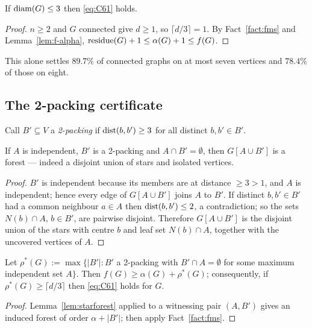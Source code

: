 \begin{theorem}\label{thm:diam3}
\Selem
If $\operatorname{diam}(G) \le 3$ then \eqref{eq:C61} holds.
\end{theorem}

\begin{proof}
$n \ge 2$ and $G$ connected give $d \ge 1$, so $\lceil d/3 \rceil = 1$. By
Fact~\ref{fact:fms} and Lemma~\ref{lem:f-alpha},
$\operatorname{residue}(G) + 1 \le \alpha(G) + 1 \le f(G)$.
\end{proof}

This alone settles $89.7\%$ of connected graphs on at most seven vertices and $78.4\%$ of
those on eight.

\subsection{The 2-packing certificate}

Call $B' \subseteq V$ a \emph{2-packing} if $\operatorname{dist}(b,b') \ge 3$ for all distinct
$b,b' \in B'$.

\begin{lemma}\label{lem:starforest}
\Selem
If $A$ is independent, $B'$ is a 2-packing and $A \cap B' = \emptyset$, then
$G[A \cup B']$ is a forest --- indeed a disjoint union of stars and isolated vertices.
\end{lemma}

\begin{proof}
$B'$ is independent because its members are at distance $\ge 3 > 1$, and $A$ is
independent; hence every edge of $G[A \cup B']$ joins $A$ to $B'$. If distinct
$b,b' \in B'$ had a common neighbour $a \in A$ then $\operatorname{dist}(b,b') \le 2$, a contradiction;
so the sets $N(b) \cap A$, $b \in B'$, are pairwise disjoint. Therefore $G[A \cup B']$ is
the disjoint union of the stars with centre $b$ and leaf set $N(b) \cap A$, together with
the uncovered vertices of $A$.
\end{proof}

\begin{theorem}\label{thm:packing}
\Selem
Let
$\rho^{*}(G) := \max\{ |B'| : B'$ a 2-packing with $B' \cap A = \emptyset$ for some maximum
independent set $A \}$.
Then $f(G) \ge \alpha(G) + \rho^{*}(G)$; consequently, if
$\rho^{*}(G) \ge \lceil d/3 \rceil$ then \eqref{eq:C61} holds for $G$.
\end{theorem}

\begin{proof}
Lemma~\ref{lem:starforest} applied to a witnessing pair $(A,B')$ gives an induced forest of
order $\alpha + |B'|$; then apply Fact~\ref{fact:fms}.
\end{proof}

